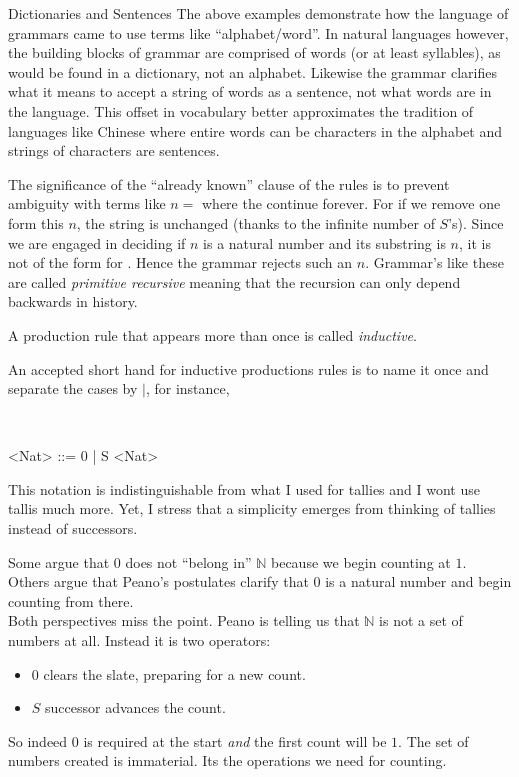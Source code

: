 \begin{remark}{Dictionaries and Sentences}
    The above examples demonstrate how the language of grammars came to 
    use terms like ``alphabet/word''. 
    In natural languages however, the building blocks of grammar are comprised of words (or
    at least syllables), as would be found in a dictionary, not an alphabet.  
    Likewise the grammar clarifies what it means to accept a string of words as a sentence,
    not what words are in the language. This offset in vocabulary better 
    approximates the tradition of languages like Chinese
    where entire words can be characters in the alphabet and strings of
    characters are sentences.
\end{remark}

The significance of the ``already known'' clause of the rules is to prevent ambiguity 
with terms like $n=$ where the  continue forever.
For if we remove one  form this $n$, the string is unchanged (thanks to 
the infinite number of $S$'s).  Since we are engaged in deciding if $n$ is a natural number and its substring 
is $n$, it is not of the form  for .  Hence the grammar 
rejects such an $n$.  Grammar's like these are called \emph{primitive recursive}
meaning that the recursion can only depend backwards 
in history.

\begin{definition}
    A production rule that appears more than once is called \emph{inductive}.
\end{definition}

An accepted short hand for inductive productions rules is to name it once 
and separate the cases by $\mid$, for instance,
\begin{center}
 \\
\begin{Gcode}[]
<Nat> ::= 0 
        | S <Nat>
\end{Gcode}
\end{center}
This notation is indistinguishable from what I used for tallies and 
I wont use tallis much more.  Yet, I stress that a simplicity emerges from thinking 
of tallies instead of successors.
    

\begin{remark}{}
    Some argue that $0$ does not ``belong in'' $\mathbb{N}$ because 
    we begin counting at $1$.  Others argue that Peano's postulates
    clarify that $0$ is a natural number and begin counting from there.\\

    Both perspectives miss the point.  Peano is telling us that $\mathbb{N}$
    is not a set of numbers at all.  Instead it is two operators:
    \begin{itemize}
        \item $0$ clears the slate, preparing for a new count.
        \item $S$ successor advances the count.
    \end{itemize}
    So indeed $0$ is required at the start \emph{and} the first count will be $1$.
    The set of numbers created is immaterial.  Its the operations we need for counting.
\end{remark}


